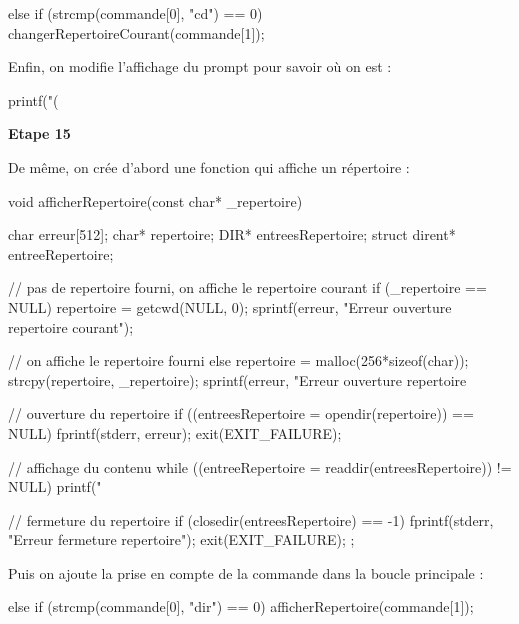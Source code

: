 \documentclass[a4paper, 12pt]{article}
\begin{document}
\begin{ccode}
else if (strcmp(commande[0], "cd") == 0) {
	changerRepertoireCourant(commande[1]);
}
\end{ccode}

Enfin, on modifie l'affichage du prompt pour savoir où on est :

\begin{ccode}
printf("(%
\end{ccode}

\bigskip
\noindent
\textbf{Etape 15}

\bigskip
De même, on crée d'abord une fonction qui affiche un répertoire :

\begin{ccode}
void afficherRepertoire(const char* _repertoire) {
        char erreur[512];
        char* repertoire;
        DIR* entreesRepertoire;
        struct dirent* entreeRepertoire;

        // pas de repertoire fourni, on affiche le repertoire courant
	if (_repertoire == NULL) {
                repertoire = getcwd(NULL, 0);
                sprintf(erreur, "Erreur ouverture repertoire courant\n");
        }

	// on affiche le repertoire fourni
        else {
                repertoire = malloc(256*sizeof(char));
                strcpy(repertoire, _repertoire);
                sprintf(erreur, "Erreur ouverture repertoire %
        }

	// ouverture du repertoire
        if ((entreesRepertoire = opendir(repertoire)) == NULL) {
                fprintf(stderr, erreur);
                exit(EXIT_FAILURE);
        }

	// affichage du contenu
        while ((entreeRepertoire = readdir(entreesRepertoire)) != NULL) {
                printf("%
        }

	// fermeture du repertoire
        if (closedir(entreesRepertoire) == -1) {
                fprintf(stderr, "Erreur fermeture repertoire\n");
                exit(EXIT_FAILURE);
        };
}
\end{ccode}

\newpage
Puis on ajoute la prise en compte de la commande dans la boucle principale :

\begin{ccode}
else if (strcmp(commande[0], "dir") == 0) {
	afficherRepertoire(commande[1]);
}
\end{ccode}
\end{document}
